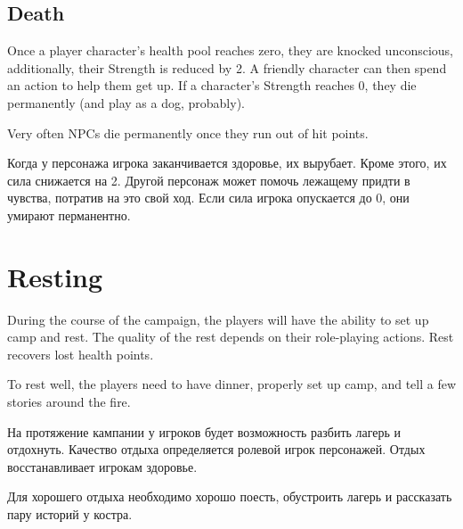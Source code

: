 \documentclass[a5paper,11pt]{book}
\begin{document}
\begin{multicols}{2}
\subsection{Death}
\begin{en}
Once a player character's health pool reaches zero, they are knocked unconscious, additionally, their Strength is reduced by 2. A friendly character can then spend an action to help them get up. If a character's Strength reaches 0, they die permanently (and play as a dog, probably).

Very often NPCs die permanently once they run out of hit points.
\end{en}

\begin{ru}
  Когда у персонажа игрока заканчивается здоровье, их вырубает. Кроме этого, их сила снижается на 2. Другой персонаж может помочь лежащему придти в чувства, потратив на это свой ход. Если сила игрока опускается до 0, они умирают перманентно.
\end{ru}

\section{Resting}
\begin{en}
During the course of the campaign, the players will have the ability to set up camp and rest. The quality of the rest depends on their role-playing actions. Rest recovers lost health points.

To rest well, the players need to have dinner, properly set up camp, and tell a few stories around the fire.
\end{en}

\begin{ru}
На протяжение кампании у игроков будет возможность разбить лагерь и отдохнуть. Качество отдыха определяется ролевой игрок персонажей. Отдых восстанавливает игрокам здоровье.

Для хорошего отдыха необходимо хорошо поесть, обустроить лагерь и рассказать пару историй у костра.
\end{ru}

\end{multicols}
\end{document}
